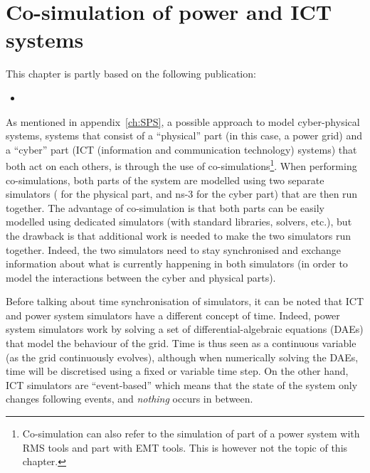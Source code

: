 \chapter{Co-simulation of power and ICT systems}
\label{ch:cosim}
\minitoc

\begin{tcolorbox}[width=\linewidth, sharp corners=all,
    colback=white!80!black,
    colframe=white!80!black]
This chapter is partly based on the following publication:
\begin{itemize}
    \item {}
\end{itemize}
\end{tcolorbox}

As mentioned in appendix~\ref{ch:SPS}, a possible approach to model cyber-physical systems, \ie systems that consist of a ``physical'' part (in this case, a power grid) and a ``cyber'' part (\ie ICT (information and communication technology) systems) that both act on each others, is through the use of co-simulations\footnote{Co-simulation can also refer to the simulation of part of a power system with RMS tools and part with EMT tools. This is however not the topic of this chapter.}. When performing co-simulations, both parts of the system are modelled using two separate simulators (\eg \Dynawo{} for the physical part, and ns-3 for the cyber part) that are then run together. The advantage of co-simulation is that both parts can be easily modelled using dedicated simulators (with standard libraries, solvers, etc.), but the drawback is that additional work is needed to make the two simulators run together. Indeed, the two simulators need to stay synchronised and exchange information about what is currently happening in both simulators (in order to model the interactions between the cyber and physical parts).

Before talking about time synchronisation of simulators, it can be noted that ICT and power system simulators have a different concept of time. Indeed, power system simulators work by solving a set of differential-algebraic equations (DAEs) that model the behaviour of the grid. Time is thus seen as a continuous variable (as the grid continuously evolves), although when numerically solving the DAEs, time will be discretised using a fixed or variable time step. On the other hand, ICT simulators are ``event-based'' which means that the state of the system only changes following events, and \emph{nothing} occurs in between.

